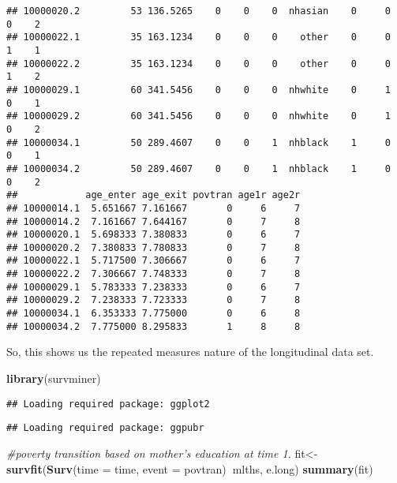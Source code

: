 \documentclass[
]{article}
\newenvironment{Shaded}{\begin{snugshade}}{\end{snugshade}}
\newcommand{\CommentTok}[1]{\textcolor[rgb]{0.56,0.35,0.01}{\textit{#1}}}
\newcommand{\DataTypeTok}[1]{\textcolor[rgb]{0.13,0.29,0.53}{#1}}
\newcommand{\KeywordTok}[1]{\textcolor[rgb]{0.13,0.29,0.53}{\textbf{#1}}}
\newcommand{\NormalTok}[1]{#1}
\newcommand{\OperatorTok}[1]{\textcolor[rgb]{0.81,0.36,0.00}{\textbf{#1}}}
\begin{document}
\begin{verbatim}
## 10000020.2         53 136.5265    0    0    0  nhasian    0     0     0    2
## 10000022.1         35 163.1234    0    0    0    other    0     0     1    1
## 10000022.2         35 163.1234    0    0    0    other    0     0     1    2
## 10000029.1         60 341.5456    0    0    0  nhwhite    0     1     0    1
## 10000029.2         60 341.5456    0    0    0  nhwhite    0     1     0    2
## 10000034.1         50 289.4607    0    0    1  nhblack    1     0     0    1
## 10000034.2         50 289.4607    0    0    1  nhblack    1     0     0    2
##            age_enter age_exit povtran age1r age2r
## 10000014.1  5.651667 7.161667       0     6     7
## 10000014.2  7.161667 7.644167       0     7     8
## 10000020.1  5.698333 7.380833       0     6     7
## 10000020.2  7.380833 7.780833       0     7     8
## 10000022.1  5.717500 7.306667       0     6     7
## 10000022.2  7.306667 7.748333       0     7     8
## 10000029.1  5.783333 7.238333       0     6     7
## 10000029.2  7.238333 7.723333       0     7     8
## 10000034.1  6.353333 7.775000       0     6     8
## 10000034.2  7.775000 8.295833       1     8     8
\end{verbatim}

So, this shows us the repeated measures nature of the longitudinal data
set.

\begin{Shaded}
\begin{Highlighting}[]
\KeywordTok{library}\NormalTok{(survminer)}
\end{Highlighting}
\end{Shaded}

\begin{verbatim}
## Loading required package: ggplot2
\end{verbatim}

\begin{verbatim}
## Loading required package: ggpubr
\end{verbatim}

\begin{Shaded}
\begin{Highlighting}[]
\CommentTok{#poverty transition based on mother's education at time 1.}
\NormalTok{fit<-}\KeywordTok{survfit}\NormalTok{(}\KeywordTok{Surv}\NormalTok{(}\DataTypeTok{time =}\NormalTok{ time, }\DataTypeTok{event =}\NormalTok{ povtran)}\OperatorTok{~}\NormalTok{mlths, e.long)}
\KeywordTok{summary}\NormalTok{(fit)}
\end{Highlighting}
\end{Shaded}
\end{document}
